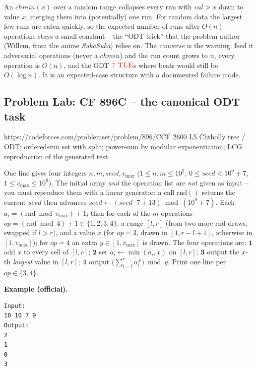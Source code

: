 \begin{insightbox}
An \(\mathit{chmin}(x)\) over a random range collapses every run with
\(\mathit{val}>x\) down to value \(x\), merging them into (potentially) one run.
For random data the largest few runs are eaten quickly, so the expected number of
runs after \(O(n)\) operations stays a small constant -- the ``ODT trick'' that the
problem author (Willem, from the anime \emph{SukaSuka}) relies on.  The
\emph{converse} is the warning: feed it adversarial operations (never a
\(\mathit{chmin}\)) and the run count grows to \(n\), every operation is
\(O(n)\), and the ODT \(\tle\)s where beats would still be \(O(\log n)\).  It is
an expected-case structure with a documented failure mode.
\end{insightbox}

\subsection{Problem Lab: CF 896C -- the canonical ODT task}

  {https://codeforces.com/problemset/problem/896/C}{CF 2600 L5}
  {Chtholly tree / ODT; ordered-run set with split; power-sum by modular exponentiation; LCG reproduction of the generated test}

\begin{problemstatement}
One line gives four integers \(n,m,\mathit{seed},v_{\max}\)
(\(1\le n,m\le10^5\), \(0\le\mathit{seed}<10^9{+}7\), \(1\le v_{\max}\le10^9\)).
The initial array \emph{and} the operation list are \emph{not} given as input --
you must reproduce them with a linear generator: a call
\(\mathrm{rnd}()\) returns the current \(\mathit{seed}\) then advances
\(\mathit{seed}\leftarrow(\mathit{seed}\cdot 7+13)\bmod(10^9{+}7)\).  Each
\(a_i=(\mathrm{rnd}\bmod v_{\max})+1\); then for each of the \(m\) operations
\(\mathit{op}=(\mathrm{rnd}\bmod 4)+1\in\{1,2,3,4\}\), a range
\([l,r]\) (from two more rnd draws, swapped if \(l>r\)), and a value \(x\) (for
\(\mathit{op}=3\), drawn in \([1,r{-}l{+}1]\), otherwise in \([1,v_{\max}]\)); for
\(\mathit{op}=4\) an extra \(y\in[1,v_{\max}]\) is drawn.  The four operations are:
\(\mathbf{1}\) add \(x\) to every cell of \([l,r]\);
\(\mathbf{2}\) set \(a_i\leftarrow\min(a_i,x)\) on \([l,r]\);
\(\mathbf{3}\) output the \(x\)-th \emph{largest} value in \([l,r]\);
\(\mathbf{4}\) output \(\big(\sum_{i=l}^{r} a_i^{\,x}\big)\bmod y\).
Print one line per \(\mathit{op}\in\{3,4\}\).

\textbf{Example (official).}
\begin{verbatim}
Input:
10 10 7 9
Output:
2
1
0
3
\end{verbatim}
\end{problemstatement}

